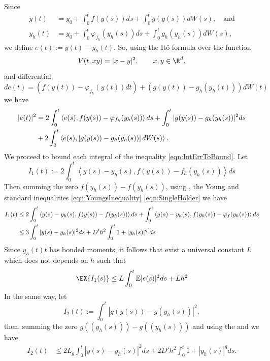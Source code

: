 \documentclass[sort&compress, preprint]{elsarticle}
\theoremstyle{definition}
\theoremstyle{plain}%
\theoremstyle{remark}
\newcommand{\m}[1]{\mathbb{E}#1}
\newcommand{\innerprod}[2]{\left\langle#1, #2\right\rangle}
\begin{document}
\begin{pf}
	Since
	\begin{align*}
		y(t) &= y_0 + \int_{0}^t f(y(s))ds + \int_{0}^t g(y(s))dW(s), \quad \text{and} \\
		y_h(t) &= y_0 + \int_{0}^t \varphi_{f_h}(y_h(s))ds + \int_{0}^t g_h(y_h(s))dW(s),
	\end{align*}
	we define $e(t):= y(t)-y_h(t)$. So, using the It\^{o} formula over the function
	$$
		V(t,xy) = |x-y|^2, \qquad x,y\in \R^d,
	$$ 
	and  differential
	$$
		d e(t) = 
		\left(
			f(y(t)) - \varphi_{f_h}(y(t)) dt
		\right)
		+
		\left(
			g(y(t)) - g_h(y_h(t))
		\right) dW(t)
	$$
	we have
	\begin{align} \label{eqn:IntErrToBound}
		|e(t)|^2 
		&=
			2 \int_{0}^t
				\innerprod{e(s)}{f(y(s))-\varphi_{f_h}(y_h(s))} ds 
			+
			\int_{0}^t
				|g(y(s)) - g_h(y_h(s))|^2 ds\notag\\
		&+
			2 \int_{0}^t
				\innerprod{e(s)}{\left[ g(y(s))-g_h(y_h(s)) \right] dW(s)}.
	\end{align}
	We proceed to bound each integral of the inequality \eqref{eqn:IntErrToBound}.
	Let 
	$$
		I_1(t):= 
			2\int_{0}^t
				\innerprod{y(s) - y_h(s)}{f(y(s)) - f_h(y_h(s))}ds			
	$$
	Then summing the zero $f(y_h(s))-f(y_h(s))$, using , the Young and  standard 
	inequalities \eqref{eqn:YoungsInequality} \eqref{eqn:SingleHolder} we have
	\begin{align*}
		I_1(t) 
		&\leq
			2\int_0^t
				\innerprod{y(s) - y_h(s)}{f(y(s))-f(y_h(s))} ds
			+
			 \int_0^t
				 \innerprod{y(s) - y_h(s)}{f(y_h(s))-\varphi_{f}(y_h(s))} ds \notag\\
%	
		&\leq
			3\int_0^t
				|y(s) - y_h(s)|^2ds
			+ D' h^2 
			\int_0^t
				1 + |y_h(s)|^{q'} ds
	\end{align*}
	Since $y_h(t)t$ has bonded moments, it follows that exist a universal constant $L$ which does not depends on $h$ 
	such that
	\begin{equation}\label{eqn:I1Bound} 
		 \EX{
			 I_1(s)	
		 }
		 \leq
			 L\int_{0}^t
				\m{|e(s)|^2} ds
		+ L h^2
	 \end{equation}
	In the same way, let
	$$
		I_2(t):= 
			\int_{0}^t
				\left|
					g(y(s)) - g(y_h(s))
				\right|^2,
	$$ 
	then, summing the zero $g((y_h(s)))-g((y_h(s)))$ and using the  and 
	 we have
	\begin{align*}
		I_2(t) 
		&\leq
			2 L_g 
			\int_{0}^t
				|y(s) - y_h(s)|^2 ds
			+
			2D'h^2
			\int_0^t
				1 + |y_h(s)|^q ds. 	 

\end{align*}
\end{pf}
\end{document}
